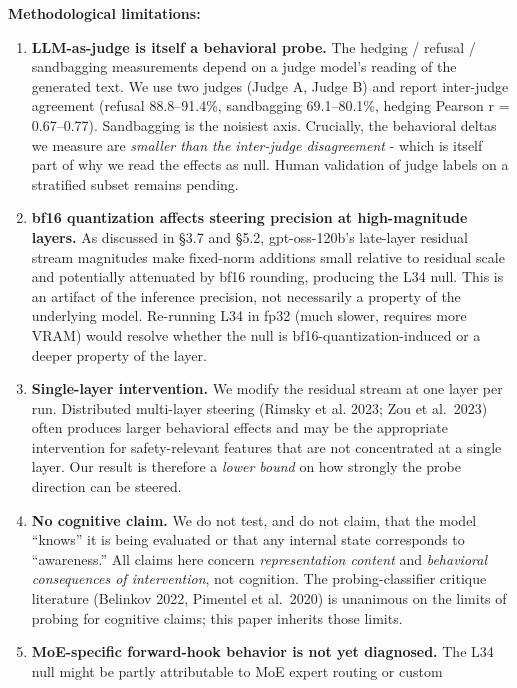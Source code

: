 \documentclass[
]{article}
\begin{document}
\textbf{Methodological limitations:}

\begin{enumerate}
\def\labelenumi{\arabic{enumi}.}
\setcounter{enumi}{5}
\item
  \textbf{LLM-as-judge is itself a behavioral probe.} The hedging /
  refusal / sandbagging measurements depend on a judge model's reading
  of the generated text. We use two judges (Judge A, Judge B) and report
  inter-judge agreement (refusal 88.8--91.4\%, sandbagging 69.1--80.1\%,
  hedging Pearson r = 0.67--0.77). Sandbagging is the noisiest axis.
  Crucially, the behavioral deltas we measure are \emph{smaller than the
  inter-judge disagreement} - which is itself part of why we read the
  effects as null. Human validation of judge labels on a stratified
  subset remains pending.
\item
  \textbf{bf16 quantization affects steering precision at high-magnitude
  layers.} As discussed in §3.7 and §5.2, gpt-oss-120b's late-layer
  residual stream magnitudes make fixed-norm additions small relative to
  residual scale and potentially attenuated by bf16 rounding, producing
  the L34 null. This is an artifact of the inference precision, not
  necessarily a property of the underlying model. Re-running L34 in fp32
  (much slower, requires more VRAM) would resolve whether the null is
  bf16-quantization-induced or a deeper property of the layer.
\item
  \textbf{Single-layer intervention.} We modify the residual stream at
  one layer per run. Distributed multi-layer steering (Rimsky et al.
  2023; Zou et al.~2023) often produces larger behavioral effects and
  may be the appropriate intervention for safety-relevant features that
  are not concentrated at a single layer. Our result is therefore a
  \emph{lower bound} on how strongly the probe direction can be steered.
\item
  \textbf{No cognitive claim.} We do not test, and do not claim, that
  the model ``knows'' it is being evaluated or that any internal state
  corresponds to ``awareness.'' All claims here concern
  \emph{representation content} and \emph{behavioral consequences of
  intervention}, not cognition. The probing-classifier critique
  literature (Belinkov 2022, Pimentel et al.~2020) is unanimous on the
  limits of probing for cognitive claims; this paper inherits those
  limits.
\item
  \textbf{MoE-specific forward-hook behavior is not yet diagnosed.} The
  L34 null might be partly attributable to MoE expert routing or custom

\end{enumerate}
\end{document}
